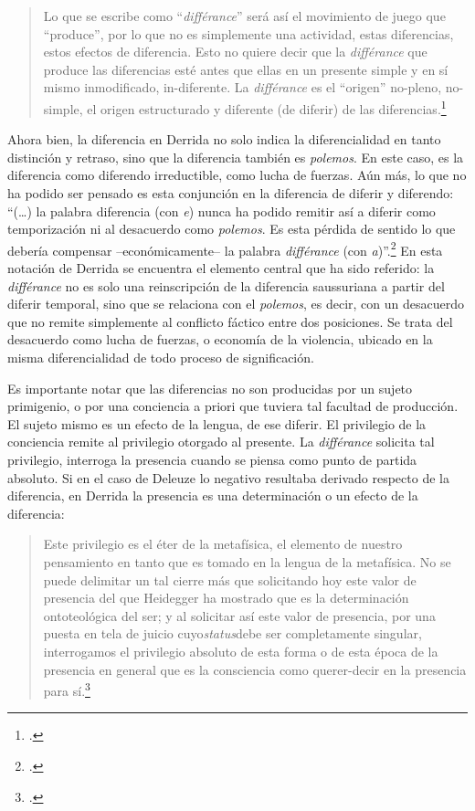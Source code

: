 \documentclass{book}
\begin{document}
\begin{quote}
Lo que se escribe como ``\emph{différance}'' será así el movimiento de
juego que ``produce'', por lo que no es simplemente una actividad, estas
diferencias, estos efectos de diferencia. Esto no quiere decir que la
\emph{différance} que produce las diferencias esté antes que ellas en un
presente simple y en sí mismo inmodificado, in-diferente. La
\emph{différance} es el ``origen'' no-pleno, no-simple, el origen
estructurado y diferente (de diferir) de las diferencias.\footcite[12]{derrida1989d}
\end{quote}

Ahora bien, la diferencia en Derrida no solo indica la diferencialidad
en tanto distinción y retraso, sino que la diferencia también es
\emph{polemos}. En este caso, es la diferencia como diferendo
irreductible, como lucha de fuerzas. Aún más, lo que no ha podido ser
pensado es esta conjunción en la diferencia de diferir y diferendo:
\enquote{(\dots) la palabra diferencia (con \emph{e}) nunca ha podido
remitir así a diferir como temporización ni al desacuerdo como
\emph{polemos}. Es esta pérdida de sentido lo que debería compensar
--económicamente-- la palabra \emph{différance} (con
\emph{a})}.\footcite[8]{derrida1989d} En esta notación de Derrida se
encuentra el elemento central que ha sido referido: la \emph{différance}
no es solo una reinscripción de la diferencia saussuriana a partir del
diferir temporal, sino que se relaciona con el \emph{polemos}, es decir,
con un desacuerdo que no remite simplemente al conflicto fáctico entre
dos posiciones. Se trata del desacuerdo como lucha de fuerzas, o
economía de la violencia, ubicado en la misma diferencialidad de todo
proceso de significación.

Es importante notar que las diferencias no son producidas por un sujeto
primigenio, o por una conciencia a priori que tuviera tal facultad de
producción. El sujeto mismo es un efecto de la lengua, de ese diferir.
El privilegio de la conciencia remite al privilegio otorgado al
presente. La \emph{différance} solicita tal privilegio, interroga la
presencia cuando se piensa como punto de partida absoluto. Si en el caso
de Deleuze lo negativo resultaba derivado respecto de la diferencia, en
Derrida la presencia es una determinación o un efecto de la diferencia:

\begin{quote}
Este privilegio es el éter de la metafísica, el elemento de nuestro
pensamiento en tanto que es tomado en la lengua de la metafísica. No se
puede delimitar un tal cierre más que solicitando hoy este valor de
presencia del que Heidegger ha mostrado que es la determinación
ontoteológica del ser; y al solicitar así este valor de presencia, por
una puesta en tela de juicio cuyo\emph{status}debe ser completamente
singular, interrogamos el privilegio absoluto de esta forma o de esta
época de la presencia en general que es la consciencia como querer-decir
en la presencia para sí.\footcite[17]{derrida1989d}
\end{quote}
\end{document}

